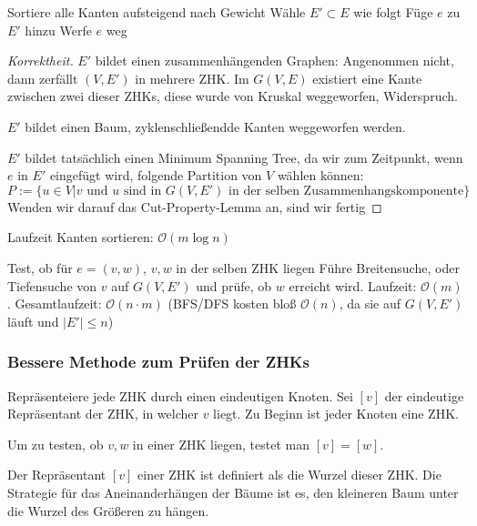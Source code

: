 \documentclass[11pt]{scrartcl}
\renewcommand{\O}{\mathcal{O}}
\begin{document}
\begin{alg}
	\begin{algorithmic}
		\State Sortiere alle Kanten aufsteigend nach Gewicht
		\State Wähle $E' \subset E$ wie folgt
				\State Füge $e$ zu $E'$ hinzu
			\Else
				\State Werfe $e$ weg
			\EndIf
		\EndFor
	\end{algorithmic}

	\begin{proof}[Korrektheit]
		$E'$ bildet einen zusammenhängenden Graphen:
		Angenommen nicht, dann zerfällt $(V,E')$ in mehrere ZHK.
		Im $G(V,E)$ existiert eine Kante zwischen zwei dieser ZHKs, diese wurde von Kruskal weggeworfen, Widerspruch.

		$E'$ bildet einen Baum, zyklenschließendde Kanten weggeworfen werden.

		$E'$ bildet tatsächlich einen Minimum Spanning Tree, da wir zum Zeitpunkt, wenn $e$ in $E'$ eingefügt wird, folgende Partition von $V$ wählen können:
		\[
			P := \{u \in V \Big| \text{$v$ und $u$ sind in $G(V,E')$ in der selben Zusammenhangskomponente}\}
		\]
		Wenden wir darauf das Cut-Property-Lemma an, sind wir fertig
	\end{proof}

	\begin{seg}{Laufzeit}
		Kanten sortieren: $\O(m\log n)$		
	\end{seg}
	\begin{seg}{Test, ob für $e=(v,w)$, $v,w$ in der selben ZHK liegen}
		Führe Breitensuche, oder Tiefensuche von $v$ auf $G(V,E')$ und prüfe, ob $w$ erreicht wird.
		Laufzeit: $\O(m)$.
		Gesamtlaufzeit: $\O(n\cdot m)$ (BFS/DFS kosten bloß $\O(n)$, da sie auf $G(V,E')$ läuft und $|E'|\le n$)
	\end{seg}
\end{alg}

\subsubsection{Bessere Methode zum Prüfen der ZHKs}
Repräsenteiere jede ZHK durch einen eindeutigen Knoten.
Sei $[v]$ der eindeutige Repräsentant der ZHK, in welcher $v$ liegt.
Zu Beginn ist jeder Knoten eine ZHK.

Um zu testen, ob $v,w$ in einer ZHK liegen, testet man $[v]=[w]$.

Der Repräsentant $[v]$ einer ZHK ist definiert als die Wurzel dieser ZHK.
Die Strategie für das Aneinanderhängen der Bäume ist es, den kleineren Baum unter die Wurzel des Größeren zu hängen.	
\end{document}
